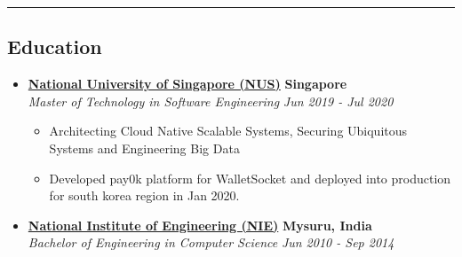 \documentclass[10pt,letterpaper]{article}
\begin{document}

\hrule
\vspace{-1.0em}
\subsection*{Education}
  \begin{itemize}
    \parskip=-0.5em

    \item[]
    {\href{http://www.nus.edu.sg/}{\textbf{National University of Singapore (NUS)}} \hfill
      \textbf{Singapore}}
    \\
    {\emph{Master of Technology in Software Engineering} \hfill
      \emph{Jun 2019 - Jul 2020}}

    \begin{itemize}[label=\textbullet]
      \item Architecting Cloud Native Scalable Systems, Securing Ubiquitous Systems and Engineering Big Data
      \item Developed pay0k platform for WalletSocket and deployed into production for south korea region in Jan 2020.
    \end{itemize}

    \item[]
    {\href{https://www.nie.ac.in/}{\textbf{National Institute of Engineering (NIE)}} \hfill
      \textbf{Mysuru, India}}
    \\
    {\emph{Bachelor of Engineering in Computer Science} \hfill
      \emph{Jun 2010 - Sep 2014}}

  \end{itemize}
  
\end{document}
